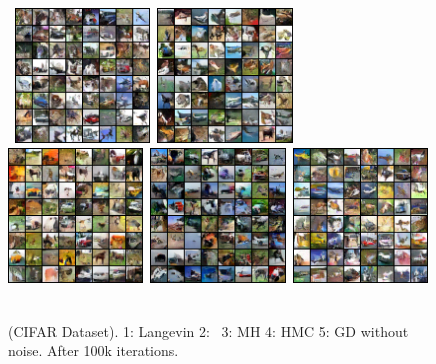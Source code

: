\documentclass[letterpaper]{article} %
\begin{document}
\begin{figure}

    \mbox{\hspace{-0.05in}
        \includegraphics[width=1.41in]{figs/cifarlangevin}
        \includegraphics[width=1.41in]{figs/cifaranila}
	\includegraphics[width=1.41in]{figs/mh_x_q_099900}        
        \includegraphics[width=1.41in]{figs/hmc_x_q_099900}
        \includegraphics[width=1.41in]{figs/gd_x_q_099900}
        }
\caption{(CIFAR Dataset). 1: Langevin 2: \algo\ 3: MH 4: HMC 5: GD without noise. After 100k iterations.}
	\label{fig:cifar}\vspace{-0.1in}
\end{figure}
\end{document}
